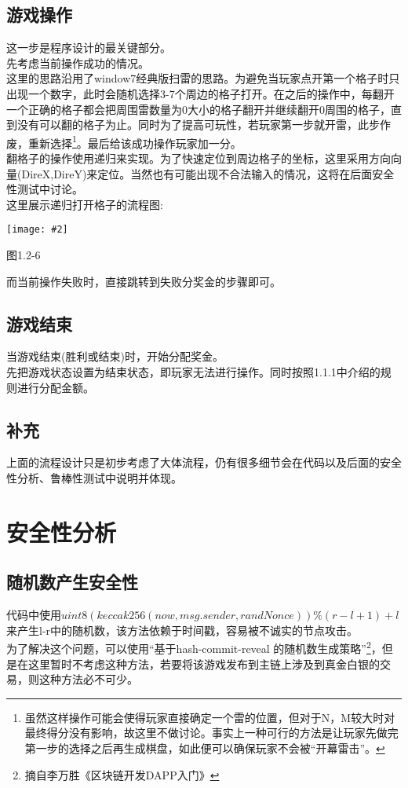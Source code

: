 \documentclass[UTF8]{ctexart}
\newcommand\picturehere[2][1]{\centerline{\texttt{[image: \#2]}}}
\begin{document}
	\subsection{游戏操作}
	\indent 这一步是程序设计的最关键部分。\\
	\indent 先考虑当前操作成功的情况。\\
	\indent 这里的思路沿用了window7经典版扫雷的思路。为避免当玩家点开第一个格子时只出现一个数字，此时会随机选择3-7个周边的格子打开。在之后的操作中，每翻开一个正确的格子都会把周围雷数量为0大小的格子翻开并继续翻开0周围的格子，直到没有可以翻的格子为止。同时为了提高可玩性，若玩家第一步就开雷，此步作废，重新选择\footnote[1]{虽然这样操作可能会使得玩家直接确定一个雷的位置，但对于N，M较大时对最终得分没有影响，故这里不做讨论。事实上一种可行的方法是让玩家先做完第一步的选择之后再生成棋盘，如此便可以确保玩家不会被“开幕雷击”。}。最后给该成功操作玩家加一分。\\
	\indent 翻格子的操作使用递归来实现。为了快速定位到周边格子的坐标，这里采用方向向量(DireX,DireY)来定位。当然也有可能出现不合法输入的情况，这将在后面安全性测试中讨论。\\
	\newpage
	\indent 这里展示递归打开格子的流程图:\\
	\picturehere[0.6]{s7.png}
	\begin{center}图1.2-6\end{center}
	\indent 而当前操作失败时，直接跳转到失败分奖金的步骤即可。
	\subsection{游戏结束}
	\indent 当游戏结束(胜利或结束)时，开始分配奖金。\\
	\indent 先把游戏状态设置为结束状态，即玩家无法进行操作。同时按照1.1.1中介绍的规则进行分配金额。
	\subsection*{补充}
	\indent 上面的流程设计只是初步考虑了大体流程，仍有很多细节会在代码以及后面的安全性分析、鲁棒性测试中说明并体现。


	\newpage
  \section{安全性分析}
  \subsection{随机数产生安全性}
	 \indent 代码中使用$uint8(keccak256(now, msg.sender, randNonce)) \% (r - l + 1) + l$来产生l-r中的随机数，该方法依赖于时间戳，容易被不诚实的节点攻击。\\
	 \indent 为了解决这个问题，可以使用“基于hash-commit-reveal 的随机数生成策略”\footnote[1]{摘自李万胜《区块链开发DAPP入门》}，但是在这里暂时不考虑这种方法，若要将该游戏发布到主链上涉及到真金白银的交易，则这种方法必不可少。
\end{document}
